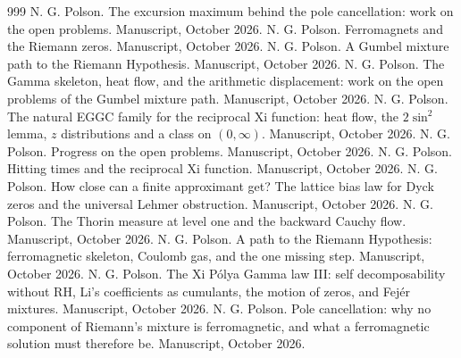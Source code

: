 \begin{thebibliography}{999}
 N. G. Polson. The excursion maximum behind the pole cancellation: work on the open problems. Manuscript, October 2026.
 N. G. Polson. Ferromagnets and the Riemann zeros. Manuscript, October 2026.
 N. G. Polson. A Gumbel mixture path to the Riemann Hypothesis. Manuscript, October 2026.
 N. G. Polson. The Gamma skeleton, heat flow, and the arithmetic displacement: work on the open problems of the Gumbel mixture path. Manuscript, October 2026.
 N. G. Polson. The natural EGGC family for the reciprocal Xi function: heat flow, the $2\sin^2$ lemma, $z$ distributions and a class on $(0,\infty)$. Manuscript, October 2026.
 N. G. Polson. Progress on the open problems. Manuscript, October 2026.
 N. G. Polson. Hitting times and the reciprocal Xi function. Manuscript, October 2026.
 N. G. Polson. How close can a finite approximant get? The lattice bias law for Dyck zeros and the universal Lehmer obstruction. Manuscript, October 2026.
 N. G. Polson. The Thorin measure at level one and the backward Cauchy flow. Manuscript, October 2026.
 N. G. Polson. A path to the Riemann Hypothesis: ferromagnetic skeleton, Coulomb gas, and the one missing step. Manuscript, October 2026.
 N. G. Polson. The Xi P\'olya Gamma law III: self decomposability without RH, Li's coefficients as cumulants, the motion of zeros, and Fej\'er mixtures. Manuscript, October 2026.
 N. G. Polson. Pole cancellation: why no component of Riemann's mixture is ferromagnetic, and what a ferromagnetic solution must therefore be. Manuscript, October 2026.

\end{thebibliography}

